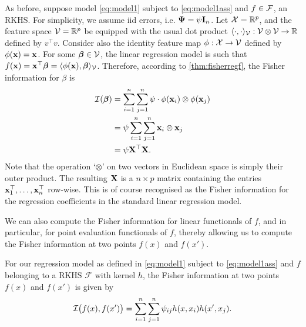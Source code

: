 \begin{example}
  As before, suppose model \cref{eq:model1} subject to \cref{eq:model1ass} and $f\in{\mathcal F}$, an RKHS.
  For simplicity, we assume iid errors, i.e. ${\bm\Psi} = \psi {\mathbf I}_n$.
  Let ${\mathcal X} = \mathbb{R}^p$, and the feature space ${\mathcal V} = \mathbb{R}^p$ be equipped with the usual dot product $\langle\cdot,\cdot\rangle_{\mathcal V}:{\mathcal V} \otimes {\mathcal V} \to \mathbb{R}$ defined by $v^\top v$.
  Consider also the identity feature map $\phi:{\mathcal X} \to {\mathcal V}$ defined by $\phi({\mathbf x})={\mathbf x}$.
  For some $\boldsymbol\beta \in {\mathcal V}$, the linear regression model is such that $f({\mathbf x}) = {\mathbf x}^\top \boldsymbol\beta = \langle\phi({\mathbf x}),\boldsymbol\beta\rangle_{\mathcal V}$.
  Therefore, according to \cref{thm:fisherregf}, the Fisher information for $\beta$ is
  \begin{align*}
    {\mathcal I}(\boldsymbol\beta) 
    &= \sum_{i=1}^n\sum_{j=1}^n \psi \cdot \phi({\mathbf x}_i) \otimes \phi({\mathbf x}_j) \\
    &= \psi \sum_{i=1}^n\sum_{j=1}^n {\mathbf x}_i \otimes {\mathbf x}_j \\
    &= \psi {\mathbf X}^\top {\mathbf X}.
  \end{align*}
  Note that the operation `$\otimes$' on two vectors in Euclidean space is simply their outer product.
  The resulting ${\mathbf X}$ is a $n \times p$ matrix containing the entries ${\mathbf x}_1^\top,\dots,{\mathbf x}_n^\top$ row-wise.
  This is of course recognised as the Fisher information for the regression coefficients in the standard linear regression model.
\end{example}

We can also compute the Fisher information for linear functionals of $f$, and in particular, for point evaluation functionals of $f$, thereby allowing us to compute the Fisher information at two points $f(x)$ and $f(x')$.

\begin{corollary}\label{thm:fisherreglinfunc}
	For \hspace{0.5pt} our \hspace{0.5pt} regression model as defined in \cref{eq:model1} subject to \cref{eq:model1ass} and $f$ belonging to a RKHS $\mathcal F$ with kernel $h$, the Fisher information at two points $f(x)$ and $f(x')$
	is given by
	\[
		{\mathcal I}\big(f(x),f(x')\big) = \sum_{i=1}^n\sum_{j=1}^n \psi_{ij} h(x,x_i)h(x',x_j).
	\]
\end{corollary}

